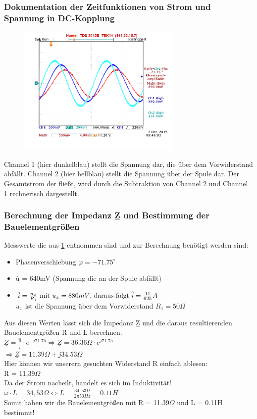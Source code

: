 \documentclass[11pt,a4paper,titlepage]{article}
\begin{document}
\subsubsection{Dokumentation der Zeitfunktionen von Strom und Spannung in DC-Kopplung}
\begin{figure}[h!]
\label{fig:aufg1}
\begin{center}
\includegraphics[width=0.7\textwidth]{5_1_1}
\end{center}
\end{figure}
Channel 1 (hier dunkelblau) stellt die Spannung dar, die \"uber dem Vorwiderstand abf\"allt. Channel 2 (hier hellblau) stellt die Spannung \"uber der Spule dar. Der Gesamtstrom der flie\ss{}t, wird durch die Subtraktion von Channel 2 und Channel 1 rechnerisch dargestellt.
\subsubsection{Berechnung der Impedanz \underline{Z} und Bestimmung der Bauelementgr\"o\ss{}en}
Messwerte die aus \ref{fig:aufg1} entnommen sind und zur Berechnung ben\"otigt werden sind:
\begin{itemize}
\item Phasenverschiebung $\varphi = -71.75^\circ$
\item \^u = 640mV (Spannung die an der Spule abf\"allt)
\item \(\hat{i} = \frac{u_x}{R_1}$ mit $u_x = 880mV$, daraus folgt $\hat{i} = \frac{11}{625}A\) \\[1ex]
$u_x$ ist die Spannung \"uber dem Vorwiderstand $R_1=50\Omega$ 
\end{itemize}  
Aus diesen Werten l\"asst sich die Impedanz \underline{Z} und die daraus resultierenden Bauelementgr\"o\ss{}en R und L berechnen. \\[1ex]
\(\underline{Z} = \frac{\hat{u}}{\hat{i}} \cdot e^{-j71.75} \Rightarrow \underline{Z} = 36.36\Omega \cdot e^{j71.75}\) \\[1ex]
$\Rightarrow \underline{Z} = 11.39\Omega + j34.53\Omega$ \\[1ex]
Hier k\"onnen wir unserern gesuchten Widerstand R einfach ablesen: \\[1ex]
R = 11,39$\Omega$ \\[1ex]
Da der Strom nacheilt, handelt es sich im Induktivit\"at! \\[1ex]
$\omega \cdot L = 34,53\Omega \Leftrightarrow L = \frac{34,53\Omega}{2\pi50Hz} = 0.11H$ \\[1ex]
Somit haben wir die Bauelementgr\"o\ss{}en mit R = 11.39$\Omega$ und L = 0.11H bestimmt!
\newpage
\end{document}
